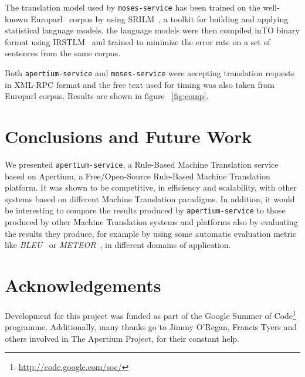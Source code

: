 \documentclass[11pt]{article}
\begin{document}
The translation model used by {\tt moses-service} has been trained on the well-known Europarl~\citep{europarl} corpus by using SRILM~\citep{srilm}, 
a toolkit for building and applying statistical language models. the language models were then compiled inTO binary format using IRSTLM~\citep{irstlm} and 
trained to minimize the error rate on a set of sentences from the same corpus. 

Both {\tt apertium-service} and {\tt moses-service} were accepting translation requests in XML-RPC format and the free text used for timing was also 
taken from Europarl corpus. Results are shown in figure ~\ref{fig:comp}.


\section{Conclusions and Future Work}

We presented {\tt apertium-service}, a Rule-Based Machine Translation service based on Apertium, a Free/Open-Source Rule-Based Machine Translation platform.
It was shown to be competitive, in efficiency and scalability, with other systems based on different Machine Translation paradigms.
In addition, it would be interesting to compare the results produced by {\tt apertium-service} to those produced by other Machine Translation systems and
platforms also by evaluating the results they produce, for example by using some automatic evaluation metric like \emph{BLEU}~\citep{bleu} or 
\emph{METEOR}~\citep{meteor}, in different domains of application.


\section*{Acknowledgements}

Development for this project was funded as part of the Google Summer of Code\footnote{\url{http://code.google.com/soc/}} programme. 
Additionally, many thanks go to Jimmy O'Regan, Francis Tyers and others involved in The Apertium Project, for their constant help.




\end{document}
